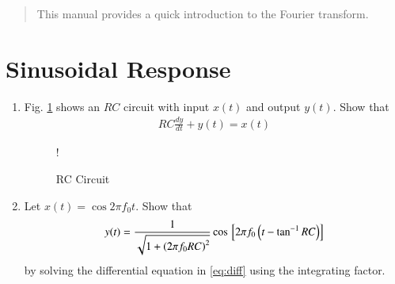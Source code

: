 \documentclass[journal,12pt,twocolumn]{IEEEtran}
\begin{document}
\tableofcontents

\bigskip

\renewcommand{\thefigure}{\theenumi}
\renewcommand{\thetable}{\theenumi}

\begin{abstract}
	This manual provides a quick introduction to the Fourier transform.
\end{abstract}
%
%
\section{Sinusoidal Response}
\begin{enumerate}[1.]
\item Fig. \ref{fig:rc} shows an $RC$ circuit with input $x(t)$ and output $y(t)$.  Show that
\begin{equation}
\label{eq:diff}
\begin{split}
RC\frac{dy}{dt} + y(t) = x(t)
\end{split}
\end{equation}
\begin{figure}[!h]
\centering
\resizebox {\columnwidth} {!} {

}
\caption{RC Circuit} 
\label{fig:rc}
\end{figure}
\item Let $x(t) = \cos 2\pi f_0 t$. Show that
\begin{equation}
y(t) = \frac{1}{\sqrt{1+\left(2\pi f_0 RC\right)^2}}\cos{}\left[2\pi f_0 \left(t - \tan^{-1}RC\right)  \right]
\end{equation}
by solving the differential equation in \eqref{eq:diff} using the integrating factor.
\begin{equation}
\begin{split}
%
\end{split}
\end{equation}
\end{enumerate}
\end{document}
